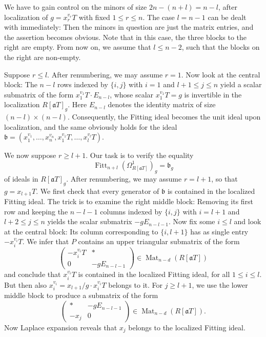 \documentclass[oneside, 12pt]{amsart}
\theoremstyle{definition}
\theoremstyle{remark}
\newcommand{\ideala}{\mathfrak{a}}
\newcommand{\idealb}{\mathfrak{b}}
\newcommand{\Fitt}{\operatorname{Fitt}}
\newcommand{\Mat}{\operatorname{Mat}}
\begin{document}
We have to gain  control  on  the minors of size $2n-(n+l)=n-l$, after localization of $g=x_r^{v_r}T$
with   fixed  $1\leq r\leq n$. The case $l=n-1$ can be dealt with immediately:
Then the minors in question are just the matrix entries,
and the assertion becomes obvious.  Note that in this case, the three blocks to the right are empty.
From now on, we assume that $l\leq n-2$, such that the blocks on the right are non-empty.
 
Suppose    $r\leq l$. After renumbering, we may assume $r=1$. Now look  at the central block:
The $n-l$ rows  indexed by $\{i,j\}$   with  $i=1$ and $l+1\leq  j\leq  n$ yield a scalar submatrix of the form
$x_1^{v_1}T\cdot E_{n-l}$, whose  scalar $ x_1^{v_1}T=g$ is  invertible  in the localization $R[\ideala T]_g$. Here $E_{n-l}$ denotes
the identity matrix of size $(n-l)\times(n-l)$.
Consequently,   the     Fitting ideal becomes the unit ideal upon localization, and the same obviously holds for the ideal
$\idealb=(x_1^{v_1},\ldots,x_n^{v_n},x_1^{v_1}T,\ldots,x_l^{v_l}T)$.

We now suppose $r\geq l+1$. Our  task is to verify the equality
$$
\Fitt_{n+l}(\Omega^1_{R[\ideala T]})_g = \idealb_g 
$$
of ideals in $R[\ideala T]_g$. After renumbering, 
we may assume $r=l+1$,  so that $g=x_{l+1} T$.  
We first check that every generator  of $\idealb$ is contained in the localized Fitting ideal.
The trick   is to  examine the  right middle block:
Removing its first row and keeping the  $n-l-1$ columns    indexed by $\{i,j\}$   with $i=l+1$ and $l+2\leq j\leq n$
yields the  scalar submatrix $-g E_{n-l-1}$.
Now fix some $i\leq l$ and  look at the central block: Its column corresponding to $\{i,l+1\}$  
has as single entry $-x_i^{v_i}T$. We infer that $P$ contains   an upper triangular submatrix   of the form
$$
\begin{pmatrix}
-x_i^{v_i}T 	& \ast\\
0		& -g E_{n-l-1}
\end{pmatrix} 
\in\Mat_{n-d}(R[\ideala T])
$$
and conclude that $x_i^{v_i}T$ is contained in the localized Fitting ideal, for all $1\leq i\leq l$. 
But then also  $x_i^{v_i}=x_{l+1}/g\cdot x_i^{v_i}T$ belongs to it. For $j\geq l+1$,
we use the lower middle block to produce a  submatrix of the form
$$
\begin{pmatrix}
\ast 		& -g E_{n-l-1}\\
-x_j 	& 0
\end{pmatrix} 
\in\Mat_{n-d}(R[\ideala T]).
$$
Now Laplace expansion reveals that $x_j$ belongs to the localized Fitting ideal.
\end{document}

